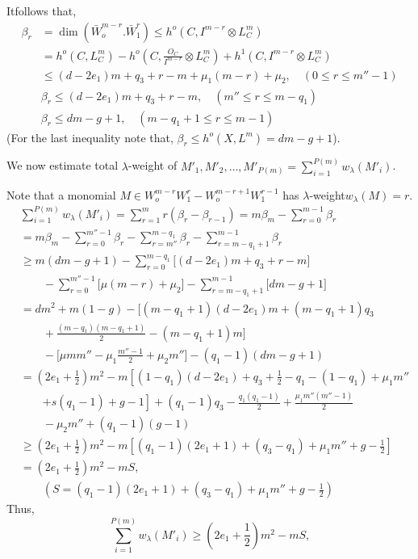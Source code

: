  It\pageoriginale follows that,
 \begin{align*}
	\beta_r & = \dim(\bar{W}^{m-r}_o. \bar{W}^r_1) \leq h^o
   (C,I^{m-r}\otimes L^m_C)\\ 
	& = h^o (C,L^m_C) - h^o(C, \frac{O_C}{I^{m-r}} \otimes L^m_C) +
   h^1 (C, I^{m-r}\otimes L^m_C)\\ 
	& \le(d- 2e_1) m + q_3 + r-m + \mu_1 (m-r) + \mu_2, \quad (0 \le r \le
   m''-1)\\ 
	&\beta_r \le (d-2e_1) m + q_3 + r-m, \quad (m'' \le r \le m-q_1)\\
	&\beta_r  \le dm-g+1, \quad (m-q_1+1 \le r \le m-1)
 \end{align*} 
 (For the last inequality note that, $\beta_r \le h^o(X,L^m)=
 dm-g+1$). 
 
 \noindent
 We now estimate total  $\lambda$-weight of $M'_1, M'_2, \ldots ,
 M'_{P(m)} = \sum\limits^{P(m)}_{i=1} w_\lambda (M'_i)$.  
 
 
 \noindent
 Note that a monomial $M \in W_o^{m-r} W^r_1 - W^{m-r+1}_o W^{r-1}_1$ has
 $\lambda$-weight\break $w_\lambda(M)=r$. 
{\fontsize{10}{12}\selectfont
 \begin{align*}
& \sum_{i=1}^{P(m)} w_\lambda (M'_i) = \sum^{m}_{r=1} r ( \beta_r-
   \beta_{r-1}) = m\beta_m - \sum_{r=0}^{m-1} \beta_r\\ 
& = m \beta_m - \sum_{r=0}^{m''-1} \beta_r - \sum_{r=m''}^{m-q_1}
   \beta_r - \sum_{r=m-q_1+1}^{m-1}\beta_r\\ 
& \ge m(dm-g+1) - \sum_{r=0}^{m-q_1} \bigg [ (d- 2e_1 )m + q_3 +r-m
     \bigg ] \\
& \qquad - \sum_{r=0}^{m''-1} \bigg[ \mu(m-r)+ \mu_2 \bigg]-
   \sum_{r=m-q_1+1}^{m-1}\bigg[ dm-g+1 \bigg ]\\ 
& = dm^2 + m(1-g)- \bigg [ (m-q_1+1)(d-2e_1)m +(m-q_1+1) q_3\\ 
&\qquad+\frac{(m-q_1)(m-q_1+1)}{2} -(m-q_1+1)m \bigg]\\ 
&\qquad-\bigg[\mu mm''-\mu_1 \frac{m''-1}{2} + \mu_2 m'' \bigg]-  (q_1-1)(dm-g+1)
   \\
& = (2e_1 + \frac{1}{2})m^2 - m \left[(1-q_1) (d-2e_1) + q_3 +
     \frac{1}{2} - q_1-(1-q_1) + \mu_1 m''\right.\\
& \qquad \left. + s(q_1-1) +g -1 \right] +
   (q_1-1)q_3 - \frac{q_1(q_1-1)}{2} + \frac{\mu_1 m'' (m''-1)}{2}\\
& \qquad  - \mu_2 m''+ (q_1-1) (g-1)\\ 
 & \ge (2e_1 + \frac{1}{2}) m^2 - m \left[(q_1 -1) (2e_1 + 1) +
   (q_3 - q_1) + \mu_1 m'' + g - \frac{1}{2}\right ]\\ 
 & = \left(2e_1 + \frac{1}{2}\right) m^2 - mS,\\ 
&\qquad\left(S = (q_1 -1)(2e_1 + 1) + (q_3 -
 q_1) + \mu_1 m'' + g - \frac{1}{2}\right)
 \end{align*}}\relax\pageoriginale
Thus,
\begin{equation*}
  \sum\limits_{i = 1}^{P(m)} w_\lambda (M'_i) \ge (2e_1 +
\frac{1}{2}) m^2 - mS,  \tag*{$(E_l)$}
\end{equation*}

